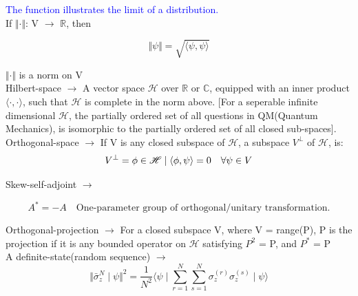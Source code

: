 \documentclass[a4paper, 10pt, onepage]{elegantbook}
\begin{document}
{\textcolor{blue}{The function illustrates the limit of a distribution.}  \\

If $\Vert \cdot \Vert$: V $\longrightarrow$ $\mathbb R$, then

\begin{equation}
\Vert \psi \Vert = \sqrt{\langle \psi,\psi \rangle}
\end{equation}

$\Vert \cdot \Vert$ is a norm on V  \\

Hilbert-space $\longrightarrow$ A vector space $\mathscr H$ over $\mathbb R$ or $\mathbb C$, equipped with an inner product $\langle \cdot, \cdot \rangle$,  
 such that $\mathscr H$ is complete in the norm above.       
 [For a seperable infinite dimensional $\mathscr H$, the partially ordered set of all questions in QM(Quantum Mechanics), is isomorphic
 to the partially ordered set of all closed sub-spaces].  \\

Orthogonal-space $\longrightarrow$ If V is any closed subspace of $\mathscr H$, a subspace $V^\perp$ of $\mathscr H$, is:  \\

\begin{equation}
V^\perp = {\phi \in \mathscr H \mid \langle \phi, \psi \rangle = 0 \quad \forall \psi \in V}\\
\end{equation}

Skew-self-adjoint $\longrightarrow$

\begin{equation}
A^* = - A \quad \text{One-parameter group of orthogonal/unitary transformation.}
\end{equation}

Orthogonal-projection $\longrightarrow$ For a closed subspace V, where V = range(P), P is the projection if it is any bounded operator
on $\mathscr H$ satisfying $P^2$ = P, and $P^*$ = P \\
 
A definite-state(random sequence) $\longrightarrow$
\begin{equation}
\Vert \bar{\sigma}_z^{N} \mid \psi \Vert^2 = \frac{1}{N^2} \langle \psi \mid \sum_{r=1}^N \sum_{s=1}^N \sigma_z^{(r)}\sigma_z^{(s)} \mid \psi \rangle
\end{equation}

}
\end{document}
